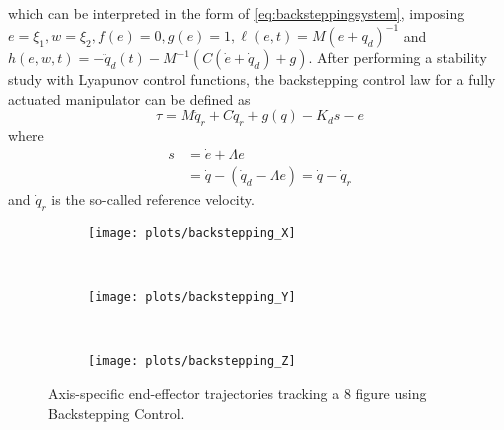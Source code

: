 which can be interpreted in the form of \eqref{eq:backsteppingsystem}, imposing $e=\xi_1, w=\xi_2, f(e)=0, g(e)=1, \ell(e,t)=M(e+q_d)^{-1}$ and $h(e,w,t)=-\ddot{q}_d(t)-M^{-1}\left(C(\dot{e}+\dot{q}_d)+g\right)$. After performing a stability study with Lyapunov control functions, the backstepping control law for a fully actuated manipulator can be defined as
\begin{equation}
\tau = M\ddot{q}_r + C\dot{q}_r + g(q) - K_{d}s - e
\label{eq:backsteppingcontrollaw}
\end{equation}
where
\begin{align*}
s &= \dot{e} + \Lambda{e}\\
&= \dot{q} - (\dot{q}_d - \Lambda{e}) = \dot{q} - \dot{q}_r
\end{align*}
and $\dot{q}_r$ is the so-called reference velocity. 

\begin{figure}[H]
	\centering
	\begin{subfigure}[t]{\textwidth}
		\texttt{[image: plots/backstepping\_X]}
	\end{subfigure}
	\\
	\begin{subfigure}[t]{\textwidth}
		\texttt{[image: plots/backstepping\_Y]}
	\end{subfigure}
	\\
	\begin{subfigure}[t]{\textwidth}
		\texttt{[image: plots/backstepping\_Z]}
	\end{subfigure}
	\caption{Axis-specific end-effector trajectories tracking a 8 figure using Backstepping Control.}
\end{figure}

